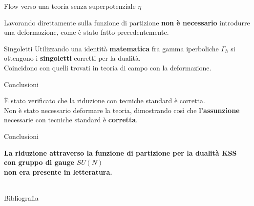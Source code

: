 \documentclass[10pt,compress,usenames,dvipsnames]{beamer}
\begin{document}
\begin{frame}{Flow verso una teoria senza superpotenziale $\eta$}

Lavorando direttamente sulla funzione di partizione \alert{\bfseries non è necessario} introdurre una deformazione, come è stato fatto precedentemente. \\
\vspace{0.5cm}
\begin{block}{Singoletti}
Utilizzando una identità \alert{\bfseries matematica} fra gamma iperboliche $\Gamma_h$  si ottengono i \alert{\bfseries singoletti} corretti per la dualità.\\
Coincidono con quelli trovati in teoria di campo con la deformazione.
\end{block}

\end{frame}


\begin{frame}{Conclusioni}
\begin{center}

{\large   
\"{E} stato verificato che la riduzione con tecniche standard è corretta.\\
Non è stato necessario deformare la teoria, dimostrando così che \alert{\bfseries l'assunzione} necessarie con tecniche standard è \alert{\bfseries corretta}. 
\\[0.3cm]
}
\end{center}
\end{frame}


\begin{frame}{Conclusioni}
\begin{center}
\large
{{\bfseries La riduzione attraverso la funzione di partizione per la dualità KSS con gruppo di gauge $SU(N)$\\ \alert{non era presente in letteratura}.}
}
\\
\vspace{0.7cm}
\\
\end{center}



\end{frame}



\begin{frame}{Bibliografia}
\nocite{*}
{ \footnotesize

}
\end{frame}
\end{document}
